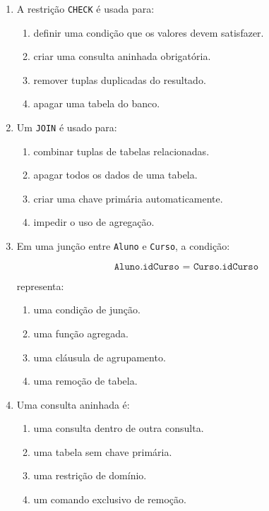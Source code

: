 \documentclass[12pt,a4paper]{article}
\begin{document}
\begin{enumerate}[label=\textbf{Q\arabic*.}]
\item A restrição \texttt{CHECK} é usada para:

\begin{enumerate}[label=\alph*)]
    \item definir uma condição que os valores devem satisfazer.
    \item criar uma consulta aninhada obrigatória.
    \item remover tuplas duplicadas do resultado.
    \item apagar uma tabela do banco.
\end{enumerate}

\item Um \texttt{JOIN} é usado para:

\begin{enumerate}[label=\alph*)]
    \item combinar tuplas de tabelas relacionadas.
    \item apagar todos os dados de uma tabela.
    \item criar uma chave primária automaticamente.
    \item impedir o uso de agregação.
\end{enumerate}

\item Em uma junção entre \texttt{Aluno} e \texttt{Curso}, a condição:

\[
\texttt{Aluno.idCurso = Curso.idCurso}
\]

representa:

\begin{enumerate}[label=\alph*)]
    \item uma condição de junção.
    \item uma função agregada.
    \item uma cláusula de agrupamento.
    \item uma remoção de tabela.
\end{enumerate}

\item Uma consulta aninhada é:

\begin{enumerate}[label=\alph*)]
    \item uma consulta dentro de outra consulta.
    \item uma tabela sem chave primária.
    \item uma restrição de domínio.
    \item um comando exclusivo de remoção.
\end{enumerate}


\end{enumerate}
\end{document}
